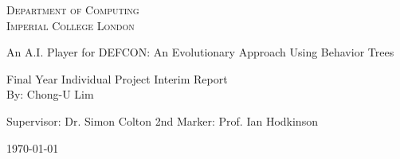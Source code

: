 \documentclass[11pt, a4paper] {report}
\begin{document}
\begin{titlepage}
\begin{center}
\textsc{\Large Department of Computing\\Imperial College London}

\vfil

{\huge An A.I. Player for DEFCON:}\linebreak \linebreak
{\huge An Evolutionary Approach Using Behavior Trees}

\vfil

{\Large Final Year Individual Project}\linebreak \linebreak
{\Large Interim Report}\\[1cm]

{\large By: Chong-U Lim }

\vfil

{\Large Supervisor: Dr. Simon Colton} \linebreak \linebreak
{\Large 2nd Marker: Prof. Ian Hodkinson}

\vfil

{\large \today}

\end{center}
\end{titlepage}


% 

\tableofcontents


\setlength{\parskip}{0.2cm}









\nocite{*}
\end{document}
